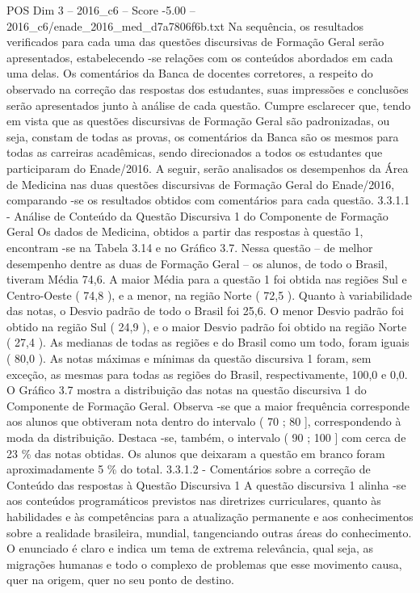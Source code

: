 \begin{textsample}{POS Dim 3 – 2016\_c6 – Score -5.00 – 2016\_c6/enade\_2016\_med\_d7a7806f6b.txt}
Na sequência, os resultados verificados para cada uma das questões discursivas de Formação Geral serão apresentados, estabelecendo -se relações com os conteúdos abordados em cada uma delas.
Os comentários da Banca de docentes corretores, a respeito do observado na correção das respostas dos estudantes, suas impressões e conclusões serão apresentados junto à análise de cada questão.
Cumpre esclarecer que, tendo em vista que as questões discursivas de Formação Geral são padronizadas, ou seja, constam de todas as provas, os comentários da Banca são os mesmos para todas as carreiras acadêmicas, sendo direcionados a todos os estudantes que participaram do Enade/2016.
A seguir, serão analisados os desempenhos da Área de Medicina nas duas questões discursivas de Formação Geral do Enade/2016, comparando -se os resultados obtidos com comentários para cada questão. 3.3.1.1 - Análise de Conteúdo da Questão Discursiva 1 do Componente de Formação Geral Os dados de Medicina, obtidos a partir das respostas à questão 1, encontram -se na Tabela 3.14 e no Gráfico 3.7.
Nessa questão – de melhor desempenho dentre as duas de Formação Geral – os alunos, de todo o Brasil, tiveram Média 74,6.
A maior Média para a questão 1 foi obtida nas regiões Sul e Centro-Oeste ( 74,8 ), e a menor, na região Norte ( 72,5 ).
Quanto à variabilidade das notas, o Desvio padrão de todo o Brasil foi 25,6.
O menor Desvio padrão foi obtido na região Sul ( 24,9 ), e o maior Desvio padrão foi obtido na região Norte ( 27,4 ).
As medianas de todas as regiões e do Brasil como um todo, foram iguais ( 80,0 ).
As notas máximas e mínimas da questão discursiva 1 foram, sem exceção, as mesmas para todas as regiões do Brasil, respectivamente, 100,0 e 0,0.
O Gráfico 3.7 mostra a distribuição das notas na questão discursiva 1 do Componente de Formação Geral.
Observa -se que a maior frequência corresponde aos alunos que obtiveram nota dentro do intervalo ( 70 ; 80 ], correspondendo à moda da distribuição.
Destaca -se, também, o intervalo ( 90 ; 100 ] com cerca de 23 \% das notas obtidas.
Os alunos que deixaram a questão em branco foram aproximadamente 5 \% do total. 3.3.1.2 - Comentários sobre a correção de Conteúdo das respostas à Questão Discursiva 1 A questão discursiva 1 alinha -se aos conteúdos programáticos previstos nas diretrizes curriculares, quanto às habilidades e às competências para a atualização permanente e aos conhecimentos sobre a realidade brasileira, mundial, tangenciando outras áreas do conhecimento.
O enunciado é claro e indica um tema de extrema relevância, qual seja, as migrações humanas e todo o complexo de problemas que esse movimento causa, quer na origem, quer no seu ponto de destino.

\end{textsample}
